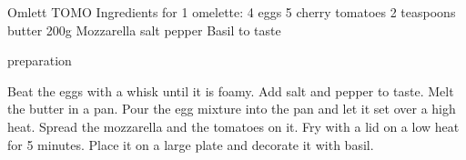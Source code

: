 
Omlett TOMO
Ingredients for 1 omelette:
4 eggs
5 cherry tomatoes
2 teaspoons butter
200g Mozzarella
salt pepper
Basil to taste

preparation

Beat the eggs with a whisk until it is foamy.
Add salt and pepper to taste.
Melt the butter in a pan.
Pour the egg mixture into the pan and let it set over a high heat.
Spread the mozzarella and the tomatoes on it.
Fry with a lid on a low heat for 5 minutes.
Place it on a large plate and decorate it with basil.
